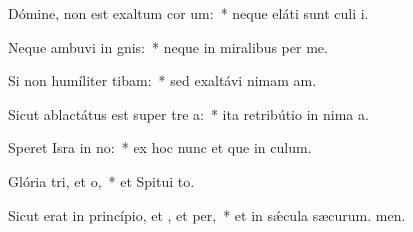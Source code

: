 \item Dómine, non est exaltum cor um:~* neque eláti sunt culi i.
\item Neque ambuvi in gnis:~* neque in miralibus per me.
\item Si non humíliter tibam:~* sed exaltávi nimam am.
\item Sicut ablactátus est super tre a:~* ita retribútio in nima a.
\item Speret Isra in no:~* ex hoc nunc et que in culum.
\item Glória tri, et o,~* et Spitui to.
\item Sicut erat in princípio, et , et per,~* et in sǽcula sæcurum. men.

